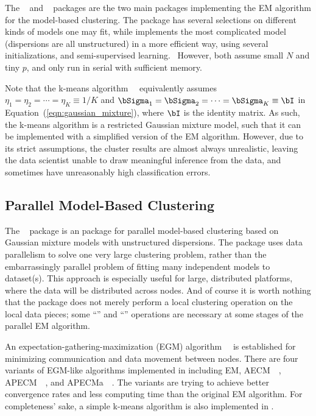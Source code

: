 The ~\citep{mclust} and
~\citep{Chen2012EMClusterpackage}
packages are the two main  packages implementing the EM algorithm
for the model-based clustering.
The  package has several selections on different kinds of models
one may fit, while  
implements the most complicated model (dispersions are all unstructured)
in a more efficient way, using several initializations, and
semi-supervised learning.~
However, both assume small $N$ and tiny $p$, and only run in serial with
sufficient memory.

Note that the k-means algorithm~\citep{Forgy1965}~
equivalently assumes
$\eta_1 = \eta_2 = \cdots = \eta_K \equiv 1/K$ and
$\bSigma_1 = \bSigma_2 = \cdots = \bSigma_K \equiv \bI$
in Equation~(\ref{eqn:gaussian_mixture}), where
$\bI$ is the identity matrix.
As such, the k-means algorithm is a restricted Gaussian mixture model, such
that it can be implemented with a simplified version of the EM algorithm.
However, due to its strict assumptions, the cluster results are almost always
unrealistic, leaving the data scientist unable to draw meaningful inference
from the data, and sometimes have unreasonably high classification errors.


\subsection{Parallel Model-Based Clustering}

The ~\citep{Chen2012pmclustpackage}
package is an 
package for parallel model-based clustering based on Gaussian mixture models
with unstructured dispersions. The package uses data parallelism to solve one
very large clustering problem, rather than the embarrassingly parallel
problem of fitting many independent models to dataset(s). This approach is
especially useful for large, distributed platforms, where the data will be
distributed across nodes. And of course it is worth nothing that the package
does not merely perform a local clustering operation on the local data
pieces; some ``'' and ``'' operations are necessary
at some stages of the parallel EM algorithm.

An expectation-gathering-maximization (EGM)
algorithm~\citep{Chen2013}~
is established for minimizing communication and data movement between nodes.
There are four variants of EGM-like algorithms implemented in 
including EM, AECM~\citep{Meng1997}~,
APECM~\citep{Chen2011}~, and
APECMa~\citep{Chen2013}~. The variants are trying to
achieve better convergence rates and less computing time than the original
EM algorithm. For completeness' sake, a simple k-means algorithm is also
implemented in .

